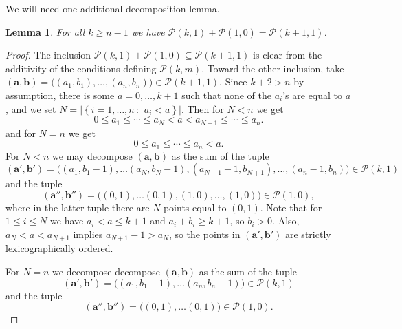 \documentclass[12pt]{amsart}
\newcommand{\aaa}{\mathbf{a}}
\newcommand{\bbb}{\mathbf{b}}
\numberwithin{equation}{section}
\newtheorem{lemma}[theorem]{Lemma}
\theoremstyle{definition}
\begin{document}
We will need one additional decomposition lemma.


\begin{lemma}\label{lem: m=1 decomp}
    For all $k\geq n-1$ we have $\mathcal{P}(k,1)+\mathcal{P}(1,0)= \mathcal{P}(k+1,1)$.
\end{lemma}

\begin{proof}
    The inclusion $ \mathcal{P}(k,1)+\mathcal{P}(1,0)\subseteq \mathcal{P}(k+1,1)$ is clear from the additivity of the conditions defining $\mathcal{P}(k,m)$. Toward the other inclusion, take $(\aaa,\bbb) = \big((a_1,b_1),\dots,(a_n,b_n)\big)\in \mathcal{P}(k+1,1)$. Since $k+2>n$ by assumption, there is some $a = 0,\dots,k+1$ such that none of the $a_i$'s are equal to $a$, and we set $N = |\left\{i=1,\dots,n \, :\ \, a_i<a\right\}|$. Then for $N<n$ we get
    $$
    0\le a_1\le \cdots\le a_N<a<a_{N+1}\le \cdots \le a_n.
    $$
    and for $N=n$ we get
    $$
    0\le a_1\le \cdots\le a_n<a.
    $$
    For $N<n$  we may decompose $(\aaa,\bbb)$ as the sum of the tuple
    \[ (\aaa',\bbb') = \big( (a_1,b_1-1),\dots (a_N,b_N-1),(a_{N+1}-1,b_{N+1}),\dots,(a_n-1,b_n)\big) \in \mathcal{P}(k,1) \]
    and the tuple
    \[ (\aaa'',\bbb'') = \big( (0,1),\dots (0,1),(1,0),\dots,(1,0)\big) \in \mathcal{P}(1,0), \]
    where in the latter tuple there are $N$ points equal to $(0,1)$. Note that  for $1\le i\le N$ we have $a_i<a\le k+1$ and $a_i+b_i\ge k+1$, so $b_i>0$. Also,
    $a_{N}<a<a_{N+1}$ implies $a_{N+1}-1>a_{N}$, so the points in $(\aaa',\bbb')$ are strictly lexicographically ordered.  

    For $N=n$ we decompose  decompose $(\aaa,\bbb)$ as the sum of the tuple
    \[ (\aaa',\bbb') = \big( (a_1,b_1-1),\dots (a_n,b_n-1) \big) \in \mathcal{P}(k,1) \]
    and the tuple
    \[ (\aaa'',\bbb'') = \big( (0,1),\dots (0,1)\big) \in \mathcal{P}(1,0). \]
\end{proof}
\end{document}
